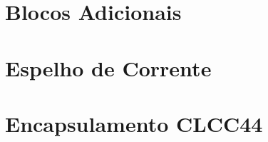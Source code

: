 \chapter{Blocos Adicionais}
\label{blocosadicionais}



\chapter{Espelho de Corrente}


\chapter{Encapsulamento CLCC44}
\label{anexo_clcc4}
